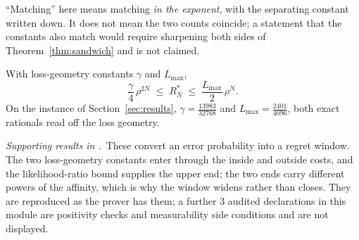 ``Matching'' here means matching \emph{in the exponent}, with the separating constant written
down. It does not mean the two counts coincide; a statement that the constants also match
would require sharpening both sides of Theorem~\ref{thm:sandwich} and is not claimed.

\begin{theorem}
\label{thm:regret}
With loss-geometry constants $\gamma$ and $L_{\max}$,
\begin{equation}
\frac{\gamma}{4}\,\rho^{2N}\;\leq\;R_{N}^{*}\;\leq\;\frac{L_{\max}}{2}\,\rho^{N}.
\label{eq:regret}
\end{equation}
On the instance of Section~\ref{sec:results}, $\gamma=\tfrac{13983}{32768}$ and
$L_{\max}=\tfrac{2401}{4096}$, both exact rationals read off the loss geometry.
\end{theorem}


\noindent\emph{Supporting results in .}~These convert an error probability into a regret window. The two loss-geometry constants enter through the inside and outside costs, and the likelihood-ratio bound supplies the upper end; the two ends carry different powers of the affinity, which is why the window widens rather than closes. They are reproduced as the prover has them; a further $3$ audited declarations in this module are positivity checks and measurability side conditions and are not displayed.

